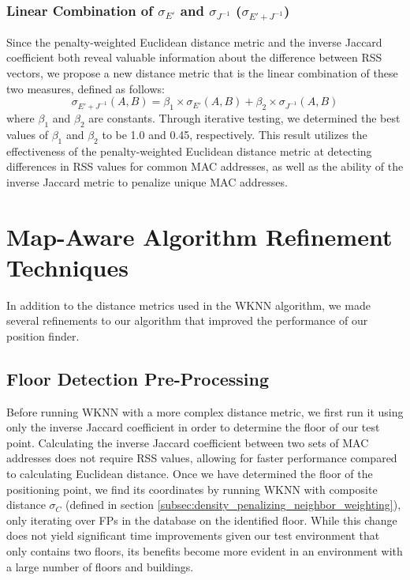 \documentclass[conference]{IEEEtran}
\begin{document}
\subsubsection{Linear Combination of $\sigma_{E'}$ and $\sigma_{J^{-1}}$ ($\sigma_{E' + J^{-1}}$)}
\indent Since the penalty-weighted Euclidean distance metric and the inverse Jaccard coefficient both reveal valuable information about the difference between RSS vectors, we propose a new distance metric that is the linear combination of these two measures, defined as follows:
\begin{equation}
\label{eq:combined}
\sigma_{E'+J^{-1}}(A, B) = \beta_1\times\sigma_{E'}(A, B)+\beta_2\times\sigma_{J^{-1}}(A, B)
\end{equation}
where $\beta_1$ and $\beta_2$ are constants. Through iterative testing, we determined the best values of $\beta_1$ and $\beta_2$ to be 1.0 and 0.45, respectively. This result utilizes the effectiveness of the penalty-weighted Euclidean distance metric at detecting differences in RSS values for common MAC addresses, as well as the ability of the inverse Jaccard metric to penalize unique MAC addresses.

\section{Map-Aware Algorithm Refinement Techniques}

In addition to the distance metrics used in the WKNN algorithm, we made several refinements to our algorithm that improved the performance of our position finder. 

\subsection{Floor Detection Pre-Processing}\label{subsec:floor_preprocessing}
\indent Before running WKNN with a more complex distance metric, we first run it using only the inverse Jaccard coefficient in order to determine the floor of our test point. Calculating the inverse Jaccard coefficient between two sets of MAC addresses does not require RSS values, allowing for faster performance compared to calculating Euclidean distance. Once we have determined the floor of the positioning point, we find its coordinates by running WKNN with composite distance $\sigma_C$ (defined in section \ref{subsec:density_penalizing_neighbor_weighting}), only iterating over FPs in the database on the identified floor. While this change does not yield significant time improvements given our test environment that only contains two floors, its benefits become more evident in an environment with a large number of floors and buildings.
\end{document}
